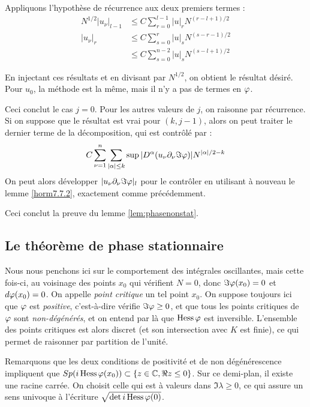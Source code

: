 \noindent Appliquons l'hypothèse de récurrence aux deux premiers termes :
\begin{align*}
N^{1/2}|u_{\nu}|_{l-1} &\leq C \sum_{r=0}^{l-1} |u|_r N^{(r-l+1)/2}\\
|u_{\nu}|_r & \leq C\sum_{s=0}^{r}|u|_sN^{(s-r-1)/2}\\
  &\leq C\sum_{s=0}^{n-2}|u|_sN^{(s-l+1)/2}
\end{align*}

\noindent En injectant ces résultats et en divisant par $N^{1/2}$, on obtient le résultat désiré. Pour $u_0$, la méthode est la même, mais il n'y a pas de termes en $\varphi$.

Ceci conclut le cas $j=0$. Pour les autres valeurs de $j$, on raisonne par récurrence. Si on suppose que le résultat est vrai pour $(k,j-1)$, alors on peut traiter le dernier terme de la décomposition, qui est contrôlé par :
\begin{equation*}
  C \sum_{\nu=1}^{n} \sum_{|\alpha| \leq
    k}\sup|D^{\alpha}(u_{\nu}\partial_{\nu}\Im \varphi)| N^{|\alpha|/2-k}
\end{equation*}
\noindent On peut alors développer $|u_{\nu}\partial_{\nu}\Im \varphi|_l$ pour le contrôler en utilisant à nouveau le lemme \ref{horm7.7.2}, exactement comme précédemment.

Ceci conclut la preuve du lemme \ref{lem:phasenonstat}.

\subsection{Le théorème de phase stationnaire}

Nous nous penchons ici sur le comportement des intégrales oscillantes, mais cette fois-ci, au voisinage des points $x_0$ qui vérifient $N=0$, donc $\Im \varphi(x_0) = 0$ et $d\varphi(x_0)=0$. On appelle \emph{point critique} un tel point $x_0$. On suppose toujours ici que $\varphi$ est \emph{positive}, c'est-à-dire vérifie $\Im \varphi \geq 0$, et que tous les points critiques de $\varphi$ sont \emph{non-dégénérés}, et on entend par là que $\operatorname{Hess} \varphi$ est inversible.
L'ensemble des points critiques est alors discret (et son intersection avec $K$ est finie), ce qui permet de raisonner par partition de l'unité.

Remarquons que les deux conditions de positivité et de non dégénérescence impliquent que  $Sp(i\operatorname{Hess}\varphi(x_0)) \subset \{z \in \mathbb{C}, \Re z \leq 0\}$. Sur ce demi-plan, il existe une racine carrée. On choisit celle qui est à valeurs dans $\Im \lambda \geq 0$, ce qui assure un sens univoque à l'écriture $\sqrt{\det i\operatorname{Hess} \varphi (0)}$.

